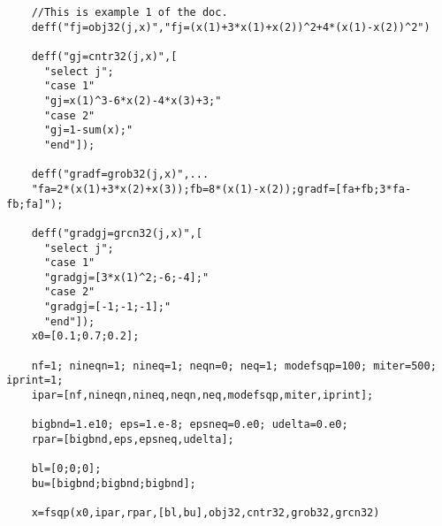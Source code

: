 \begin{examples}
  \begin{Verbatim}
    //This is example 1 of the doc.
    deff("fj=obj32(j,x)","fj=(x(1)+3*x(1)+x(2))^2+4*(x(1)-x(2))^2")

    deff("gj=cntr32(j,x)",[
      "select j";
      "case 1"
      "gj=x(1)^3-6*x(2)-4*x(3)+3;"
      "case 2"  
      "gj=1-sum(x);"
      "end"]);

    deff("gradf=grob32(j,x)",...
    "fa=2*(x(1)+3*x(2)+x(3));fb=8*(x(1)-x(2));gradf=[fa+fb;3*fa-fb;fa]");

    deff("gradgj=grcn32(j,x)",[
      "select j";
      "case 1"
      "gradgj=[3*x(1)^2;-6;-4];"
      "case 2"
      "gradgj=[-1;-1;-1];"
      "end"]);
    x0=[0.1;0.7;0.2];

    nf=1; nineqn=1; nineq=1; neqn=0; neq=1; modefsqp=100; miter=500; iprint=1;
    ipar=[nf,nineqn,nineq,neqn,neq,modefsqp,miter,iprint];

    bigbnd=1.e10; eps=1.e-8; epsneq=0.e0; udelta=0.e0;
    rpar=[bigbnd,eps,epsneq,udelta];

    bl=[0;0;0];
    bu=[bigbnd;bigbnd;bigbnd];

    x=fsqp(x0,ipar,rpar,[bl,bu],obj32,cntr32,grob32,grcn32)
  \end{Verbatim}
\end{examples}

\begin{manseealso}
     
\end{manseealso}


